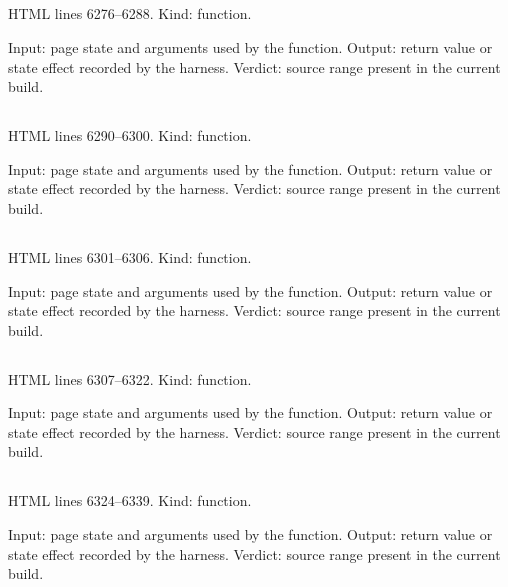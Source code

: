 \subsection*{\texttt{}}
\label{vf_287_ccI}
HTML lines 6276--6288. Kind: function.

Input: page state and arguments used by the function.
Output: return value or state effect recorded by the harness.
Verdict: source range present in the current build.

\subsection*{\texttt{}}
\label{vf_288_ccWestgard}
HTML lines 6290--6300. Kind: function.

Input: page state and arguments used by the function.
Output: return value or state effect recorded by the harness.
Verdict: source range present in the current build.

\subsection*{\texttt{}}
\label{vf_289_ccEWMA}
HTML lines 6301--6306. Kind: function.

Input: page state and arguments used by the function.
Output: return value or state effect recorded by the harness.
Verdict: source range present in the current build.

\subsection*{\texttt{}}
\label{vf_290_ccCUSUM}
HTML lines 6307--6322. Kind: function.

Input: page state and arguments used by the function.
Output: return value or state effect recorded by the harness.
Verdict: source range present in the current build.

\subsection*{\texttt{}}
\label{vf_291_ccTrend}
HTML lines 6324--6339. Kind: function.

Input: page state and arguments used by the function.
Output: return value or state effect recorded by the harness.
Verdict: source range present in the current build.

